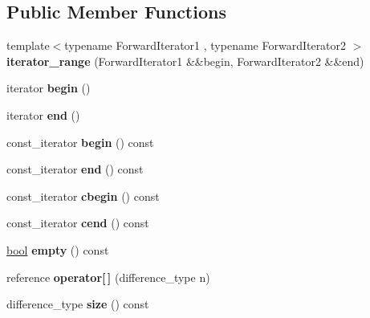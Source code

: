\subsection*{Public Member Functions}
\begin{DoxyCompactItemize}
\item 
\mbox{\label{classv8_1_1base_1_1iterator__range_af984de82dcf5c21f2b24d127d3a64d2d}} 
{\footnotesize template$<$typename Forward\+Iterator1 , typename Forward\+Iterator2 $>$ }\\{\bfseries iterator\+\_\+range} (Forward\+Iterator1 \&\&begin, Forward\+Iterator2 \&\&end)
\item 
\mbox{\label{classv8_1_1base_1_1iterator__range_a02f806b0035404d5b93bcb9e8332a45e}} 
iterator {\bfseries begin} ()
\item 
\mbox{\label{classv8_1_1base_1_1iterator__range_a60af7d9ea3bd27d3051ba92215a75e1b}} 
iterator {\bfseries end} ()
\item 
\mbox{\label{classv8_1_1base_1_1iterator__range_a378eb740352dad924cfb58605a2478d2}} 
const\+\_\+iterator {\bfseries begin} () const
\item 
\mbox{\label{classv8_1_1base_1_1iterator__range_a2059bd7cf27a84cacae4d7887b71744e}} 
const\+\_\+iterator {\bfseries end} () const
\item 
\mbox{\label{classv8_1_1base_1_1iterator__range_aee3a8310f90ef4a2e96c2c893c3c1115}} 
const\+\_\+iterator {\bfseries cbegin} () const
\item 
\mbox{\label{classv8_1_1base_1_1iterator__range_aa638ba8ecc3f40c966bfaa5eca87bce1}} 
const\+\_\+iterator {\bfseries cend} () const
\item 
\mbox{\label{classv8_1_1base_1_1iterator__range_a0124cbabbc23228927b747480e052c63}} 
\mbox{\hyperlink{classbool}{bool}} {\bfseries empty} () const
\item 
\mbox{\label{classv8_1_1base_1_1iterator__range_a0c369ce5a2faf3b78836aeb931a01db3}} 
reference {\bfseries operator\mbox{[}$\,$\mbox{]}} (difference\+\_\+type n)
\item 
\mbox{\label{classv8_1_1base_1_1iterator__range_a0c49f9dfaaddb7a986f0b8779400f4c9}} 
difference\+\_\+type {\bfseries size} () const
\end{DoxyCompactItemize}


